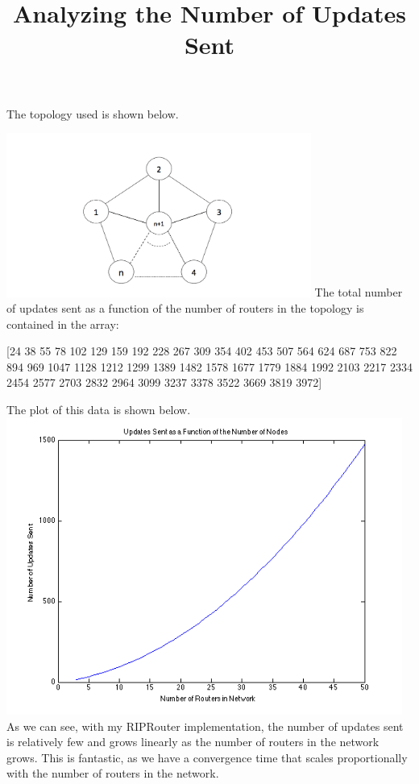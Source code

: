 \documentclass[]{article}
\begin{document}
\title{Analyzing the Number of Updates Sent}
\maketitle
\newpage
The topology used is shown below. \\
\linebreak

\begin{center}
\includegraphics[width=10cm]{topo.png}
\linebreak
The total number of updates sent as a function of the number of routers in the topology is contained in the array: 

[24
38
55
78
102
129
159
192
228
267
309
354
402
453
507
564
624
687
753
822
894
969
1047
1128
1212
1299
1389
1482
1578
1677
1779
1884
1992
2103
2217
2334
2454
2577
2703
2832
2964
3099
3237
3378
3522
3669
3819
3972]
\linebreak

The plot of this data is shown below.
\includegraphics[width=13cm]{plot.png}
\linebreak
As we can see, with my RIPRouter implementation, the number of updates sent is relatively few and grows linearly as the number of routers in the network grows. This is fantastic, as we have a convergence time that scales proportionally with the number of routers in the network.
\end{center}
\end{document}

